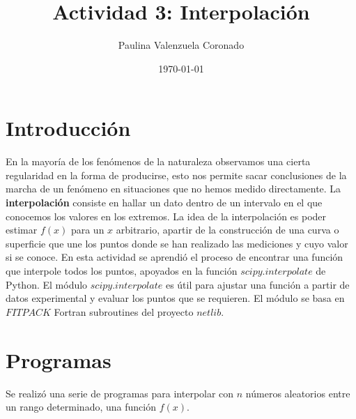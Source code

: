 \documentclass[a4paper]{article}
\title{Actividad 3: Interpolación}
\author{Paulina Valenzuela Coronado}
\date{\today}
\begin{document}
\maketitle

\section{Introducción}
En la mayoría de los fenómenos de la naturaleza observamos una cierta regularidad en la forma de producirse, esto nos permite sacar conclusiones de la marcha de un fenómeno en situaciones que no hemos medido directamente. La \textbf{interpolación} consiste en hallar un dato dentro de un intervalo en el que conocemos los valores en los extremos.\cite{P}
La idea de la interpolación es poder estimar $f(x)$ para un $x$  arbitrario, apartir de la construcción de una curva o
superficie que une los puntos donde se han realizado las mediciones y cuyo valor si se conoce.\cite{A}
En esta actividad se aprendió el proceso de encontrar una función que interpole todos los puntos, apoyados en la función $scipy.interpolate$ de Python.
El módulo $scipy.interpolate$ es útil para ajustar una función a partir de datos experimental y evaluar los puntos que se requieren. El módulo se basa en $FITPACK$ Fortran subroutines del proyecto $netlib$.\cite{U}


\section{Programas}

Se realizó una serie de programas para interpolar con $n$ números aleatorios entre un rango determinado, una función $f(x)$.
\end{document}
